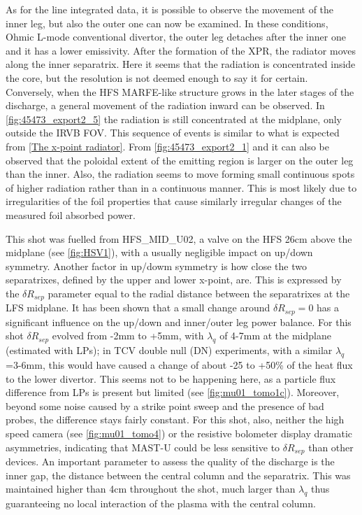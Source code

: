 As for the line integrated data, it is possible to observe the movement of the inner leg, but also the outer one can now be examined. In these conditions, Ohmic L-mode conventional divertor, the outer leg detaches after the inner one and it has a lower emissivity. After the formation of the XPR, the radiator moves along the inner separatrix. Here it seems that the radiation is concentrated inside the core, but the resolution is not deemed enough to say it for certain. Conversely, when the HFS MARFE-like structure grows in the later stages of the discharge, a general movement of the radiation inward can be observed. In \autoref{fig:45473_export2_5} the radiation is still concentrated at the midplane, only outside the IRVB FOV. This sequence of events is similar to what is expected from \autoref{The x-point radiator}. From \autoref{fig:45473_export2_1} and  it can also be observed that the poloidal extent of the emitting region is larger on the outer leg than the inner. Also, the radiation seems to move forming small continuous spots of higher radiation rather than in a continuous manner. This is most likely due to irregularities of the foil properties that cause similarly irregular changes of the measured foil absorbed power.

This shot was fuelled from HFS\_MID\_U02, a valve on the HFS 26cm above the midplane (see \autoref{fig:HSV1}), with a usually negligible impact on up/down symmetry. Another factor in up/dowm symmetry is how close the two separatrixes, defined by the upper and lower x-point, are. This is expressed by the $\delta R_{sep}$ parameter equal to the radial distance between the separatrixes at the LFS midplane. It has been shown that a small change around $\delta R_{sep}=0$ has a significant influence on the up/down and inner/outer leg power balance.\cite{Fevrier2021} For this shot $\delta R_{sep}$ evolved from -2mm to +5mm, with $\lambda_q$ of 4-7mm at the midplane (estimated with LPs\cite{Ryan2023}); in TCV double null (DN) experiments, with a similar $\lambda_q$=3-6mm, this would have caused a change of about -25 to +50\% of the heat flux to the lower divertor.\cite{Potzel2014} This seems not to be happening here, as a particle flux difference from LPs is present but limited (see \autoref{fig:mu01_tomo1c}). Moreover, beyond some noise caused by a strike point sweep and the presence of bad probes, the difference stays fairly constant.  %
For this shot, also, neither the high speed camera (see \autoref{fig:mu01_tomo4}) or the resistive bolometer display dramatic asymmetries, indicating that MAST-U could be less sensitive to $\delta R_{sep}$ than other devices. An important parameter to assess the quality of the discharge is the inner gap, the distance between the central column and the separatrix. This was maintained higher than 4cm throughout the shot, much larger than $\lambda_q$ thus guaranteeing no local interaction of the plasma with the central column.

